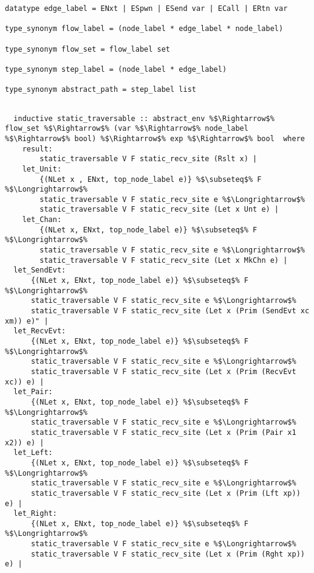\documentclass{article}
\begin{document}
\begin{lstlisting}[style=codestyle1, escapechar=\%]
datatype edge_label = ENxt | ESpwn | ESend var | ECall | ERtn var

type_synonym flow_label = (node_label * edge_label * node_label)

type_synonym flow_set = flow_label set

type_synonym step_label = (node_label * edge_label)

type_synonym abstract_path = step_label list
  \end{lstlisting}

\begin{lstlisting}[style=codestyle1, escapechar=\%]

  inductive static_traversable :: abstract_env %$\Rightarrow$% flow_set %$\Rightarrow$% (var %$\Rightarrow$% node_label %$\Rightarrow$% bool) %$\Rightarrow$% exp %$\Rightarrow$% bool  where
    result:
        static_traversable V F static_recv_site (Rslt x) |
    let_Unit:
        {(NLet x , ENxt, top_node_label e)} %$\subseteq$% F %$\Longrightarrow$%
        static_traversable V F static_recv_site e %$\Longrightarrow$%
        static_traversable V F static_recv_site (Let x Unt e) |
    let_Chan:
        {(NLet x, ENxt, top_node_label e)} %$\subseteq$% F %$\Longrightarrow$%
        static_traversable V F static_recv_site e %$\Longrightarrow$%
        static_traversable V F static_recv_site (Let x MkChn e) |
  let_SendEvt:
      {(NLet x, ENxt, top_node_label e)} %$\subseteq$% F %$\Longrightarrow$%
      static_traversable V F static_recv_site e %$\Longrightarrow$%
      static_traversable V F static_recv_site (Let x (Prim (SendEvt xc xm)) e)" |
  let_RecvEvt:
      {(NLet x, ENxt, top_node_label e)} %$\subseteq$% F %$\Longrightarrow$%
      static_traversable V F static_recv_site e %$\Longrightarrow$%
      static_traversable V F static_recv_site (Let x (Prim (RecvEvt xc)) e) |
  let_Pair:
      {(NLet x, ENxt, top_node_label e)} %$\subseteq$% F %$\Longrightarrow$%
      static_traversable V F static_recv_site e %$\Longrightarrow$%
      static_traversable V F static_recv_site (Let x (Prim (Pair x1 x2)) e) |
  let_Left:
      {(NLet x, ENxt, top_node_label e)} %$\subseteq$% F %$\Longrightarrow$%
      static_traversable V F static_recv_site e %$\Longrightarrow$%
      static_traversable V F static_recv_site (Let x (Prim (Lft xp)) e) |
  let_Right:
      {(NLet x, ENxt, top_node_label e)} %$\subseteq$% F %$\Longrightarrow$%
      static_traversable V F static_recv_site e %$\Longrightarrow$%
      static_traversable V F static_recv_site (Let x (Prim (Rght xp)) e) |

\end{lstlisting}
\end{document}
